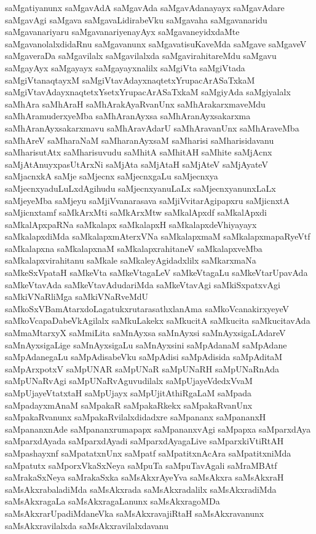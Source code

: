 {saMgatiyanunx
saMgavAdA
saMgavAda
saMgavAdanayayx
saMgavAdare
saMgavAgi
saMgava
saMgavaLidirabeVku
saMgavaha
saMgavanaridu
saMgavanariyaru
saMgavanariyenayAyx
saMgavaneyidxdaMte
saMgavanolalxdidaRnu
saMgavanunx
saMgavatisuKaveMda
saMgave
saMgaveV
saMgaveraDa
saMgavilalx
saMgavilalxda
saMgavirahitareMdu
saMgavu
saMgayAyx
saMgayayx
saMgayayxnalilx
saMgiVta
saMgiVtada
saMgiVtanaqtayxM
saMgiVtavAdayxnaqtetxYrupacArASaTxkaM
saMgiVtavAdayxnaqtetxYsetxYrupacArASaTxkaM
saMgiyAda
saMgiyalalx
saMhAra
saMhAraH
saMhArakAyaRvanUnx
saMhArakarxmaveMdu
saMhAramuderxyeMba
saMhAranAyxsa
saMhAranAyxsakarxma
saMhAranAyxsakarxmavu
saMhAravAdarU
saMhAravanUnx
saMhAraveMba
saMhAreV
saMharaNaM
saMharanAyxsaM
saMharisi
saMharisidavanu
saMharisutAtx
saMharisuvudu
saMhitA
saMhitAH
saMhite
saMjAcnx
saMjAtAnuyxpasUtArxNi
saMjAta
saMjAtaH
saMjAteV
saMjAyateV
saMjacnxkA
saMje
saMjecnx
saMjecnxgaLu
saMjecnxya
saMjecnxyaduLuLxdAgihudu
saMjecnxyanuLaLx
saMjecnxyanunxLaLx
saMjeyeMba
saMjeyu
saMjiVvanarasava
saMjiVvitarAgipapxru
saMjicnxtA
saMjicnxtamf
saMkArxMti
saMkArxMtw
saMkalApxdf
saMkalApxdi
saMkalApxpaRNa
saMkalapx
saMkalapxH
saMkalapxdeVhiyayayx
saMkalapxdiMda
saMkalapxmAterxVNa
saMkalapxmaM
saMkalapxmapaRyeVtf
saMkalapxna
saMkalapxnaM
saMkalapxrahitaneV
saMkalapxveMba
saMkalapxvirahitanu
saMkale
saMkaleyAgidadxlilx
saMkarxmaNa
saMkeSxVpataH
saMkeVta
saMkeVtagaLeV
saMkeVtagaLu
saMkeVtarUpavAda
saMkeVtavAda
saMkeVtavAdudariMda
saMkeVtavAgi
saMkiSxpatxvAgi
saMkiVNaRliMga
saMkiVNaRveMdU
saMkoSxVBamAtarxdoLagatukxrutarasathxlanAma
saMkoVcanakirxyeyeV
saMkoVcapaDabeVkAgilalx
saMkuLakekx
saMkucitA
saMkucita
saMkucitavAda
saMmaMtarxyX
saMmiLita
saMnAyxsa
saMnAyxsi
saMnAyxsigaLAdareV
saMnAyxsigaLige
saMnAyxsigaLu
saMnAyxsini
saMpAdanaM
saMpAdane
saMpAdanegaLu
saMpAdisabeVku
saMpAdisi
saMpAdisida
saMpAditaM
saMpArxpotxV
saMpUNAR
saMpUNaR
saMpUNaRH
saMpUNaRnAda
saMpUNaRvAgi
saMpUNaRvAguvudilalx
saMpUjayeVdedxVvaM
saMpUjayeVtatxtaH
saMpUjayx
saMpUjitAthiRgaLaM
saMpada
saMpadayxmAnaM
saMpakaR
saMpakaRkekx
saMpakaRvanUnx
saMpakaRvanunx
saMpakaRvilalxdidadxre
saMpananx
saMpananxH
saMpananxnAde
saMpananxrumapapx
saMpananxvAgi
saMpapxa
saMparxdAya
saMparxdAyada
saMparxdAyadi
saMparxdAyagaLive
saMparxkiVtiRtAH
saMpashayxnf
saMpatatxnUnx
saMpatf
saMpatitxnAcAra
saMpatitxniMda
saMpatutx
saMporxVkaSxNeya
saMpuTa
saMpuTavAgali
saMraMBAtf
saMrakaSxNeya
saMrakaSxka
saMsAkxrAyeYva
saMsAkxra
saMsAkxraH
saMsAkxrabaladiMda
saMsAkxrada
saMsAkxradalilx
saMsAkxradiMda
saMsAkxragaLa
saMsAkxragaLanunx
saMsAkxragoMDa
saMsAkxrarUpadiMdaneVka
saMsAkxravajiRtaH
saMsAkxravanunx
saMsAkxravilalxda
saMsAkxravilalxdavanu
}
